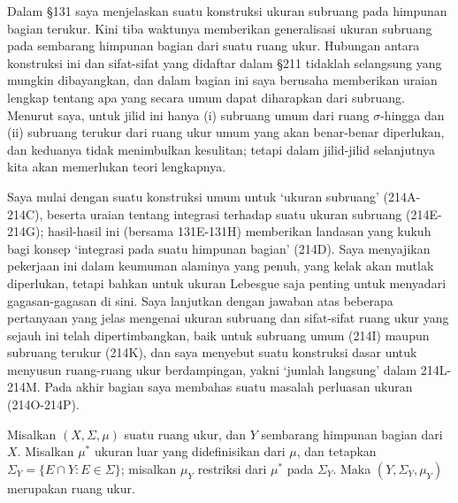 
\def\chaptername{Taksonomi ruang ukur}
\def\sectionname{Subruang}


Dalam \S131 saya menjelaskan suatu konstruksi ukuran subruang pada
himpunan bagian terukur.   Kini tiba waktunya memberikan generalisasi
ukuran subruang
pada sembarang himpunan bagian dari suatu ruang ukur.   Hubungan antara
konstruksi ini dan sifat-sifat yang didaftar dalam \S211 tidaklah
selangsung yang mungkin dibayangkan, dan dalam bagian ini saya berusaha
memberikan uraian lengkap tentang apa yang secara umum dapat diharapkan
dari subruang.   Menurut saya, untuk jilid ini hanya (i) subruang umum
dari ruang $\sigma$-hingga dan
(ii) subruang terukur dari ruang ukur umum yang akan benar-benar
diperlukan, dan keduanya tidak menimbulkan kesulitan;  tetapi dalam
jilid-jilid selanjutnya kita akan memerlukan teori lengkapnya.

Saya mulai dengan suatu konstruksi umum untuk `ukuran subruang'
(214A-214C), %
beserta uraian tentang integrasi terhadap suatu ukuran subruang
(214E-214G); %
hasil-hasil ini (bersama 131E-131H) %
memberikan landasan yang kukuh bagi
konsep `integrasi pada suatu himpunan bagian' (214D).   Saya menyajikan
pekerjaan ini dalam keumuman alaminya yang penuh, yang kelak akan mutlak
diperlukan, tetapi bahkan untuk ukuran Lebesgue saja penting untuk
menyadari gagasan-gagasan di sini.    Saya lanjutkan dengan jawaban atas
beberapa pertanyaan yang jelas mengenai ukuran subruang dan sifat-sifat
ruang ukur yang sejauh ini telah dipertimbangkan, baik untuk subruang umum
(214I) maupun subruang terukur (214K), dan saya menyebut suatu konstruksi
dasar untuk menyusun ruang-ruang ukur berdampingan, yakni `jumlah langsung'
dalam 214L-214M. Pada akhir bagian saya membahas suatu masalah perluasan
ukuran (214O-214P).

 Misalkan $(X,\Sigma,\mu)$ suatu ruang ukur, dan
$Y$ sembarang himpunan bagian dari $X$.   Misalkan $\mu^*$ ukuran luar
yang didefinisikan dari $\mu$, dan tetapkan
$\Sigma_Y=\{E\cap Y:E\in\Sigma\}$;  misalkan $\mu_Y$ restriksi dari
$\mu^*$ pada $\Sigma_Y$.   Maka $(Y,\Sigma_Y,\mu_Y)$ merupakan ruang ukur.

